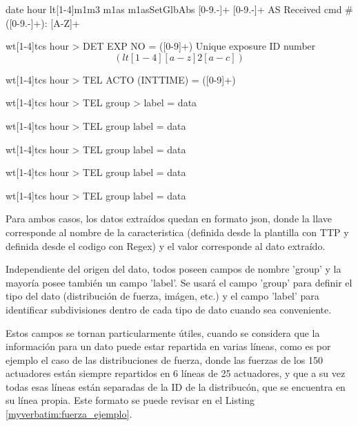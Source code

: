 \begin{enumerate}
\begin{myverbatim}[caption={Plantillas TTP},label={myverbatim:ttp}]
{{ date }} {{ hour }} lt[1-4]m1m3 m1as m1asSetGlbAbs [0-9.-]+ [0-9.-]+ AS Received cmd #([0-9.-]+): [A-Z]+

wt[1-4]tcs {{ hour }}> DET EXP NO = ([0-9]+) \/ Unique exposure ID number \[(lt[1-4][a-z]{2}[a-c])\]

wt[1-4]tcs {{ hour }}> TEL ACTO (INTTIME) = ([0-9]+)

wt[1-4]tcs {{ hour }}> TEL {{ group }} >{{ label }} = {{ data }}

wt[1-4]tcs {{ hour }}> TEL {{ group }} {{ label }} = {{ data }}

wt[1-4]tcs {{ hour }}> TEL {{ group }}{{ label }}= {{ data }}

wt[1-4]tcs {{ hour }}> TEL {{ group }}{{ label }}= {{ data }}

wt[1-4]tcs {{ hour }}> TEL {{ group }} {{ label }} = {{ data }}
    
    \end{myverbatim}

\end{enumerate}

Para ambos casos, los datos extraídos quedan en formato json, donde la llave corresponde al nombre de la caracteristica (definida desde la plantilla con TTP y definida desde el codigo con Regex) y el valor corresponde al dato extraído.

Independiente del origen del dato, todos poseen campos de nombre 'group' y la mayoría posee también un campo 'label'. Se usará el campo 'group' para definir el tipo del dato (distribución de fuerza, imágen, etc.) y el campo 'label' para identificar subdivisiones dentro de cada tipo de dato cuando sea conveniente.

Estos campos se tornan particularmente útiles, cuando se considera que la información para un dato puede estar repartida en varias líneas, como es por ejemplo el caso de las distribuciones de fuerza, donde las fuerzas de los 150 actuadores están siempre repartidos en 6 líneas de 25 actuadores, y que a su vez todas esas líneas están separadas de la ID de la distribucón, que se encuentra en su línea propia. Este formato se puede revisar en el Listing \ref{myverbatim:fuerza_ejemplo}.

